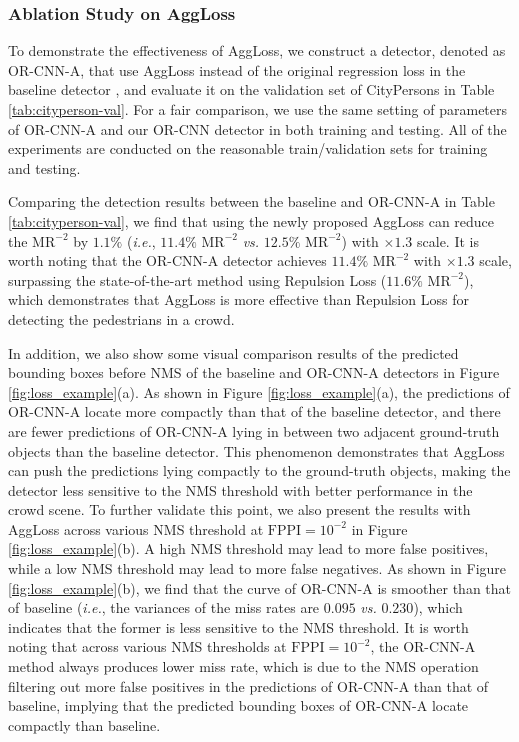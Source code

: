\documentclass[runningheads]{llncs}
\def\ie{{\em i.e.}}
\begin{document}
\subsubsection{Ablation Study on AggLoss}

To demonstrate the effectiveness of AggLoss, we construct a detector, denoted as OR-CNN-A, that use AggLoss instead of the original regression loss in the baseline detector \cite{DBLP:conf/cvpr/ZhangBS17}, and evaluate it on the validation set of CityPersons in Table \ref{tab:cityperson-val}. For a fair comparison, we use the same setting of parameters of OR-CNN-A and our OR-CNN detector in both training and testing. All of the experiments are conducted on the reasonable train/validation sets for training and testing.

Comparing the detection results between the baseline and OR-CNN-A in Table \ref{tab:cityperson-val}, we find that using the newly proposed AggLoss can reduce the $\text{MR}^{-2}$ by $1.1\%$ (\ie, $11.4\%$ $\text{MR}^{-2}$ {\em vs.} $12.5\%$ $\text{MR}^{-2}$) with $\times1.3$ scale. It is worth noting that the OR-CNN-A detector achieves $11.4\%$ $\text{MR}^{-2}$ with $\times1.3$ scale, surpassing the state-of-the-art method using Repulsion Loss \cite{DBLP:journals/corr/abs-1711-07752} ($11.6\%$ $\text{MR}^{-2}$), which demonstrates that AggLoss is more effective than Repulsion Loss \cite{DBLP:journals/corr/abs-1711-07752} for detecting the pedestrians in a crowd.


In addition, we also show some visual comparison results of the predicted bounding boxes before NMS of the baseline and OR-CNN-A detectors in Figure \ref{fig:loss_example}(a). As shown in Figure \ref{fig:loss_example}(a), the predictions of OR-CNN-A locate more compactly than that of the baseline detector, and there are fewer predictions of OR-CNN-A lying in between two adjacent ground-truth objects than the baseline detector. This phenomenon demonstrates that AggLoss can push the predictions lying compactly to the ground-truth objects, making the detector less sensitive to the NMS threshold with better performance in the crowd scene. To further validate this point, we also present the results with AggLoss across various NMS threshold at $\text{FPPI}=10^{-2}$ in Figure \ref{fig:loss_example}(b). A high NMS threshold may lead to more false positives, while a low NMS threshold may lead to more false negatives. As shown in Figure \ref{fig:loss_example}(b), we find that the curve of OR-CNN-A is smoother than that of baseline (\ie, the variances of the miss rates are $0.095$ {\em vs.} $0.230$), which indicates that the former is less sensitive to the NMS threshold. It is worth noting that across various NMS thresholds at $\text{FPPI}=10^{-2}$, the OR-CNN-A method always produces lower miss rate, which is due to the NMS operation filtering out more false positives in the predictions of OR-CNN-A than that of baseline, implying that the predicted bounding boxes of OR-CNN-A locate compactly than baseline.
\end{document}
